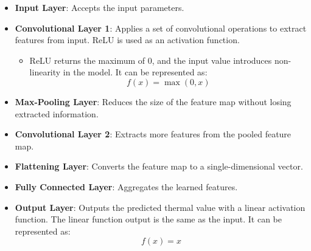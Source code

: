 \documentclass[conference]{IEEEtran}
\begin{document}
\begin{itemize}
	\item \textbf{Input Layer}: Accepts the input parameters.
	
	\item \textbf{Convolutional Layer 1}: Applies a set of convolutional operations to extract features from input. ReLU is used as an activation function.
	\begin{itemize}
		\item ReLU returns the maximum of 0, and the input value introduces non-linearity in the model. It can be represented as:
		\[
		f(x) = \max(0, x)
		\]
	\end{itemize}
	
	\item \textbf{Max-Pooling Layer}: Reduces the size of the feature map without losing extracted information.  
	
	\item \textbf{Convolutional Layer 2}: Extracts more features from the pooled feature map.
	
	\item \textbf{Flattening Layer}: Converts the feature map to a single-dimensional vector.
	
	\item \textbf{Fully Connected Layer}: Aggregates the learned features.
	
	\item \textbf{Output Layer}: Outputs the predicted thermal value with a linear activation function. The linear function output is the same as the input. It can be represented as:
	\[
	f(x) = x
	\]
\end{itemize}
\end{document}
